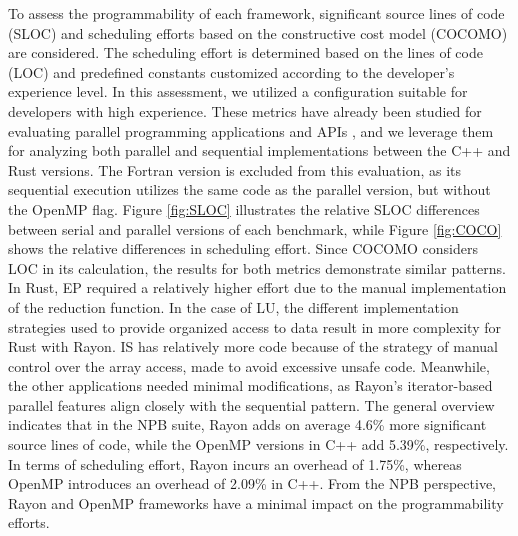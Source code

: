     To assess the programmability of each framework, significant source lines of code (SLOC) and scheduling efforts based on the constructive cost model (COCOMO) are considered. The scheduling effort is determined based on the lines of code (LOC) and predefined constants customized according to the developer's experience level. In this assessment, we utilized a configuration suitable for developers with high experience. These metrics have already been studied for evaluating parallel programming applications and APIs \cite{program}, and we leverage them for analyzing both parallel and sequential implementations between the C++ and Rust versions. The Fortran version is excluded from this evaluation, as its sequential execution utilizes the same code as the parallel version, but without the OpenMP flag. Figure \ref{fig:SLOC} illustrates the relative SLOC differences between serial and parallel versions of each benchmark, while Figure \ref{fig:COCO} shows the relative differences in scheduling effort. Since COCOMO considers LOC in its calculation, the results for both metrics demonstrate similar patterns. In Rust, EP required a relatively higher effort due to the manual implementation of the reduction function. In the case of LU, the different implementation strategies used to provide organized access to data result in more complexity for Rust with Rayon. IS has relatively more code because of the strategy of manual control over the array access, made to avoid excessive unsafe code. Meanwhile, the other applications needed minimal modifications, as Rayon's iterator-based parallel features align closely with the sequential pattern. The general overview indicates that in the NPB suite, Rayon adds on average 4.6\% more significant source lines of code, while the OpenMP versions in C++ add 5.39\%, respectively. In terms of scheduling effort, Rayon incurs an overhead of 1.75\%, whereas OpenMP introduces an overhead of 2.09\% in C++. From the NPB perspective, Rayon and OpenMP frameworks have a minimal impact on the programmability efforts.


    
    
   


    
    


    



    


